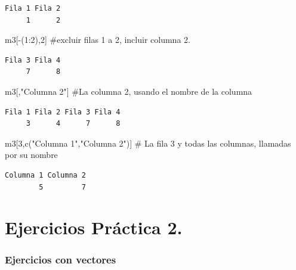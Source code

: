 \documentclass[
  letterpaper,
]{scrbook}
\newenvironment{Shaded}{\begin{snugshade}}{\end{snugshade}}
\newcommand{\CommentTok}[1]{\textcolor[rgb]{0.37,0.37,0.37}{#1}}
\newcommand{\DecValTok}[1]{\textcolor[rgb]{0.68,0.00,0.00}{#1}}
\newcommand{\FunctionTok}[1]{\textcolor[rgb]{0.28,0.35,0.67}{#1}}
\newcommand{\NormalTok}[1]{\textcolor[rgb]{0.00,0.23,0.31}{#1}}
\newcommand{\SpecialCharTok}[1]{\textcolor[rgb]{0.37,0.37,0.37}{#1}}
\newcommand{\StringTok}[1]{\textcolor[rgb]{0.13,0.47,0.30}{#1}}
\begin{document}
\begin{verbatim}
Fila 1 Fila 2 
     1      2 
\end{verbatim}

\begin{Shaded}
\begin{Highlighting}[]
\NormalTok{m3[}\SpecialCharTok{{-}}\NormalTok{(}\DecValTok{1}\SpecialCharTok{:}\DecValTok{2}\NormalTok{),}\DecValTok{2}\NormalTok{] }\CommentTok{\#excluir filas 1 a 2, incluir columna 2.}
\end{Highlighting}
\end{Shaded}

\begin{verbatim}
Fila 3 Fila 4 
     7      8 
\end{verbatim}

\begin{Shaded}
\begin{Highlighting}[]
\NormalTok{m3[,}\StringTok{"Columna 2"}\NormalTok{] }\CommentTok{\#La columna 2, usando el nombre de la columna}
\end{Highlighting}
\end{Shaded}

\begin{verbatim}
Fila 1 Fila 2 Fila 3 Fila 4 
     3      4      7      8 
\end{verbatim}

\begin{Shaded}
\begin{Highlighting}[]
\NormalTok{m3[}\DecValTok{3}\NormalTok{,}\FunctionTok{c}\NormalTok{(}\StringTok{"Columna 1"}\NormalTok{,}\StringTok{"Columna 2"}\NormalTok{)] }\CommentTok{\# La fila 3 y todas las columnas, llamadas por su nombre}
\end{Highlighting}
\end{Shaded}

\begin{verbatim}
Columna 1 Columna 2 
        5         7 
\end{verbatim}

\hypertarget{ejercicios-pruxe1ctica-2.}{%
\chapter{Ejercicios Práctica 2.}\label{ejercicios-pruxe1ctica-2.}}

\hypertarget{ejercicios-con-vectores}{%
\subsection{Ejercicios con vectores}\label{ejercicios-con-vectores}}
\end{document}
